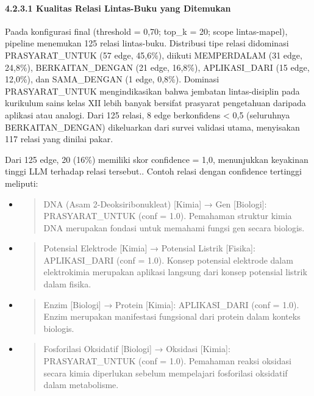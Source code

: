 \documentclass[
]{article}
\begin{document}
\hypertarget{kualitas-relasi-lintas-buku-yang-ditemukan}{%
\paragraph{4.2.3.1 Kualitas Relasi Lintas-Buku yang
Ditemukan}\label{kualitas-relasi-lintas-buku-yang-ditemukan}}

Paada konfigurasi final (threshold = 0,70; top\_k = 20; scope
lintas-mapel), pipeline menemukan 125 relasi lintas-buku. Distribusi
tipe relasi didominasi PRASYARAT\_UNTUK (57 edge, 45,6\%), diikuti
MEMPERDALAM (31 edge, 24,8\%), BERKAITAN\_DENGAN (21 edge, 16,8\%),
APLIKASI\_DARI (15 edge, 12,0\%), dan SAMA\_DENGAN (1 edge, 0,8\%).
Dominasi PRASYARAT\_UNTUK mengindikasikan bahwa jembatan lintas-disiplin
pada kurikulum sains kelas XII lebih banyak bersifat prasyarat
pengetahuan daripada aplikasi atau analogi. Dari 125 relasi, 8 edge
berkonfidens \textless{} 0,5 (seluruhnya BERKAITAN\_DENGAN) dikeluarkan
dari survei validasi utama, menyisakan 117 relasi yang dinilai pakar.

Dari 125 edge, 20 (16\%) memiliki skor confidence = 1,0, menunjukkan
keyakinan tinggi LLM terhadap relasi tersebut.. Contoh relasi dengan
confidence tertinggi meliputi:

\begin{itemize}
\item
  \begin{quote}
  DNA (Asam 2-Deoksiribonukleat) {[}Kimia{]} → Gen {[}Biologi{]}:
  PRASYARAT\_UNTUK (conf = 1.0). Pemahaman struktur kimia DNA merupakan
  fondasi untuk memahami fungsi gen secara biologis.
  \end{quote}
\item
  \begin{quote}
  Potensial Elektrode {[}Kimia{]} → Potensial Listrik {[}Fisika{]}:
  APLIKASI\_DARI (conf = 1.0). Konsep potensial elektrode dalam
  elektrokimia merupakan aplikasi langsung dari konsep potensial listrik
  dalam fisika.
  \end{quote}
\item
  \begin{quote}
  Enzim {[}Biologi{]} → Protein {[}Kimia{]}: APLIKASI\_DARI (conf =
  1.0). Enzim merupakan manifestasi fungsional dari protein dalam
  konteks biologis.
  \end{quote}
\item
  \begin{quote}
  Fosforilasi Oksidatif {[}Biologi{]} → Oksidasi {[}Kimia{]}:
  PRASYARAT\_UNTUK (conf = 1.0). Pemahaman reaksi oksidasi secara kimia
  diperlukan sebelum mempelajari fosforilasi oksidatif dalam
  metabolisme.
  \end{quote}
\end{itemize}
\end{document}
